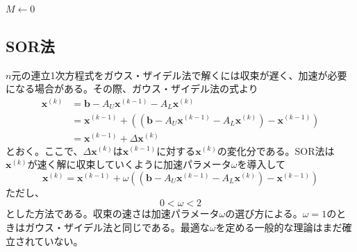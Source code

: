 \documentclass[12pt,a4paper]{ltjsreport}
\begin{document}
\begin{algorithm}[H]
\caption{ガウス・ザイデル法}
\BlankLine
$M \leftarrow 0$\;
\end{algorithm}

\subsection{SOR法}

$n$元の連立1次方程式をガウス・ザイデル法で解くには収束が遅く、加速が必要になる場合がある。その際、ガウス・ザイデル法の式より
\begin{equation}
\begin{aligned}
\boldsymbol{x}^{(k)} &= \boldsymbol{b} - A_U\boldsymbol{x}^{(k-1)} - A_L\boldsymbol{x}^{(k)} \\
&= \boldsymbol{x}^{(k-1)} + ((\boldsymbol{b} - A_U\boldsymbol{x}^{(k-1)} - A_L\boldsymbol{x}^{(k)}) - \boldsymbol{x}^{(k-1)}) \\
&= \boldsymbol{x}^{(k-1)} + \Delta\boldsymbol{x}^{(k)}
\end{aligned}
\end{equation}
とおく。ここで、$\Delta\boldsymbol{x}^{(k)}$は$\boldsymbol{x}^{(k-1)}$に対する$\boldsymbol{x}^{(k)}$の変化分である。SOR法は$\boldsymbol{x}^{(k)}$が速く解に収束していくように加速パラメータ$\omega$を導入して
\begin{equation}
\boldsymbol{x}^{(k)} = \boldsymbol{x}^{(k-1)} + \omega((\boldsymbol{b} - A_U\boldsymbol{x}^{(k-1)} - A_L\boldsymbol{x}^{(k)}) - \boldsymbol{x}^{(k-1)})
\end{equation}
ただし、
\begin{equation}
0 < \omega < 2
\end{equation}
とした方法である。収束の速さは加速パラメータ$\omega$の選び方による。$\omega = 1$のときはガウス・ザイデル法と同じである。最適な$\omega$を定める一般的な理論はまだ確立されていない。
\end{document}
